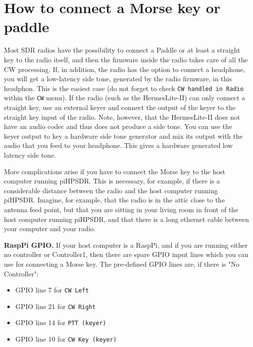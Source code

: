 \documentclass[12pt]{book}
\def\rett#1{\texttt{\color{red}#1}}
\def\bltt#1{\texttt{\color{blue}#1}}
\begin{document}
\chapter[Connect a Morse Key]{How to connect a Morse key or paddle}
\label{sec:ConnectCW}

Most SDR radios have the possibility to connect a Paddle or at least a straight key to the
radio itself, and then the firmware inside the radio takes care of all the CW processing.
If, in addition, the radio has the option to  connect a headphone, you will get a low-latency
side tone, generated by the radio firmware, in this headphon.
This is the easiest case (do not forget to check \rett{CW handled in Radio} within the
\bltt{CW} menu). If the radio (such as the HermesLite-II) can only connect a straight key,
use an external keyer and connect the output of the keyer to the straight key input of the radio.
Note, however, that the HermesLite-II does not have an audio codec and thus does not produce a
side tone. You can use the keyer output to key a hardware side tone generator and mix its
output with the audio that you feed to your headphone. This gives a hardware generated low
latency side tone.

More complications arise if you have to connect the Morse key to the host computer running
piHPSDR. This is necessary, for example, if there is a considerable distance between the
radio and the host computer running piHPSDR. Imagine, for example, that the radio is
in the attic close to the antenna feed point, but that you are sitting in your living room
in front of the host computer running piHPSDR, and that there is a long ethernet cable
between your computer and your radio.

\textbf{RaspPi GPIO.} If your host computer is a RaspPi, and if you are running either no controller
or Controller1, then there are spare GPIO input lines which you can use for connecting a Morse
key. The pre-defined GPIO lines are, if there is "No Controller":

\begin{itemize}
\item{GPIO line 7 for \bltt{CW Left}}
\item{GPIO line 21 for \bltt{CW Right}}
\item{GPIO line 14 for \bltt{PTT (keyer)}}
\item{GPIO line 10 for \bltt{CW Key (keyer)}}
\end{itemize}
\end{document}
